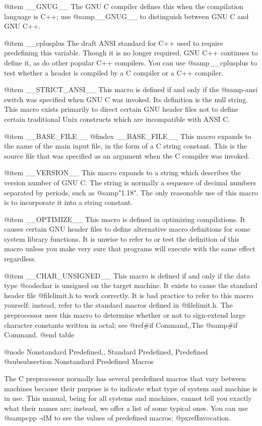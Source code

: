 {@item __GNUG__
The GNU C compiler defines this when the compilation language is
C++; use @samp{__GNUG__} to distinguish between GNU C and GNU
C++.

@item __cplusplus 
The draft ANSI standard for C++ used to require predefining this
variable.  Though it is no longer required, GNU C++ continues to define
it, as do other popular C++ compilers.  You can use @samp{__cplusplus}
to test whether a header is compiled by a C compiler or a C++ compiler.

@item __STRICT_ANSI__
This macro is defined if and only if the @samp{-ansi} switch was
specified when GNU C was invoked.  Its definition is the null string.
This macro exists primarily to direct certain GNU header files not to
define certain traditional Unix constructs which are incompatible with
ANSI C.

@item __BASE_FILE__
@findex __BASE_FILE__
This macro expands to the name of the main input file, in the form
of a C string constant.  This is the source file that was specified
as an argument when the C compiler was invoked.

@item __VERSION__
This macro expands to a string which describes the version number of
GNU C.  The string is normally a sequence of decimal numbers separated
by periods, such as @samp{"1.18"}.  The only reasonable use of this
macro is to incorporate it into a string constant.

@item __OPTIMIZE__
This macro is defined in optimizing compilations.  It causes certain
GNU header files to define alternative macro definitions for some
system library functions.  It is unwise to refer to or test the
definition of this macro unless you make very sure that programs will
execute with the same effect regardless.

@item __CHAR_UNSIGNED__
This macro is defined if and only if the data type @code{char} is
unsigned on the target machine.  It exists to cause the standard
header file @file{limit.h} to work correctly.  It is bad practice
to refer to this macro yourself; instead, refer to the standard
macros defined in @file{limit.h}.  The preprocessor uses
this macro to determine whether or not to sign-extend large character
constants written in octal; see @ref{#if Command,,The @samp{#if} Command}.
@end table

@node Nonstandard Predefined,, Standard Predefined, Predefined
@subsubsection Nonstandard Predefined Macros

The C preprocessor normally has several predefined macros that vary between
machines because their purpose is to indicate what type of system and
machine is in use.  This manual, being for all systems and machines, cannot
tell you exactly what their names are; instead, we offer a list of some
typical ones.  You can use @samp{cpp -dM} to see the values of
predefined macros; @pxref{Invocation}.

}
